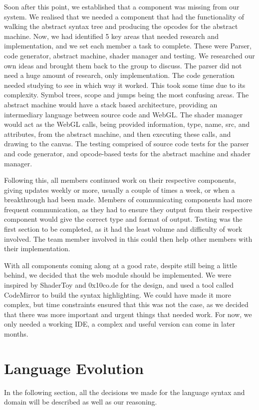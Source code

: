 \documentclass{l3proj}
\begin{document}
Soon after this point, we established that a component was missing from our system. We realised that we needed a component that had the functionality of walking the abstract syntax tree and producing the opcodes for the abstract machine. Now, we had identified 5 key areas that needed research and implementation, and we set each member a task to complete. These were Parser, code generator, abstract machine, shader manager and testing. We researched our own ideas and brought them back to the group to discuss. The parser did not need a huge amount of research, only implementation. The code generation needed studying to see in which way it worked. This took some time due to its complexity. Symbol trees, scope and jumps being the most confusing areas. The abstract machine would have a stack based architecture, providing an intermediary language between source code and WebGL. The shader manager would act as the WebGL calls, being provided information, type, name, src, and attributes, from the abstract machine, and then executing these calls, and drawing to the canvas. The testing comprised of source code tests for the parser and code generator, and opcode-based tests for the abstract machine and shader manager.

Following this, all members continued work on their respective components, giving updates weekly or more, usually a couple of times a week, or when a breakthrough had been made. Members of communicating components had more frequent communication, as they had to ensure they output from their respective component would give the correct type and format of output. Testing was the first section to be completed, as it had the least volume and difficulty of work involved. The team member involved in this could then help other members with their implementation.

With all components coming along at a good rate, despite still being a little behind, we decided that the web module should be implemented. We were inspired by ShaderToy and 0x10co.de for the design, and used a tool called CodeMirror to build the syntax highlighting. We could have made it more complex, but time constraints ensured that this was not the case, as we decided that there was more important and urgent things that needed work. For now, we only needed a working IDE, a complex and useful version can come in later months.

\chapter{Language Evolution}
\label{evo}
In the following section, all the decisions we made for the language syntax and domain will be described as well as our reasoning. 
\end{document}
